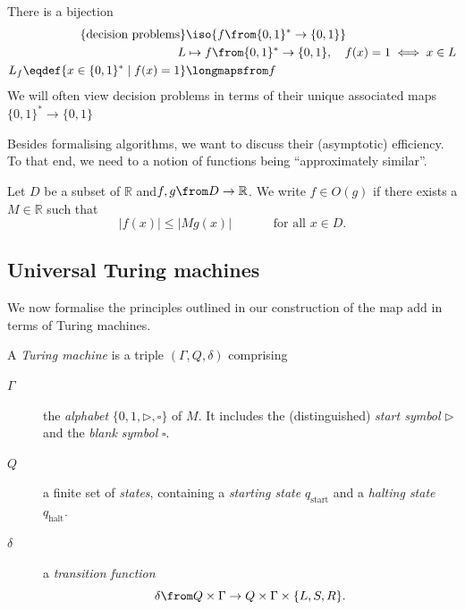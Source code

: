 \documentclass[a4paper,oneside, 12pt]{amsart}
\begin{document}
There is a bijection
\begin{equation}
  \begin{aligned}
    \{\text{decision problems}\} &\iso \{f\from\{0,1\}^{*} \to \{0,1\}\}\\
    L &\mapsto  f\from\{0,1\}^{*} \to \{0,1\}, \quad f(x)= 1 \iff x \in L \\
    L_{f}\eqdef\{x \in\{0,1\}^{*} \mid f(x) = 1\} & \longmapsfrom f
  \end{aligned}
\end{equation}
We will often view decision problems in terms of their unique associated maps \(\{0,1\}^{*}\to\{0, 1\}\)
\medskip

Besides formalising algorithms, we want to discuss their (asymptotic) efficiency.
To that end, we need to a notion of functions being ``approximately similar''.

\begin{definition}\label{def:O-notation}
  Let \(D\) be a subset of \( \mathbb{R}\) and\(f, g \from D \to \mathbb{R}\).
  We write \(f \in O(g)\) if there exists a \(M\in \mathbb{R}\) such that
  \begin{equation}
    |f(x)| \leq |M g(x) | \qquad\quad \text{ for all } x \in D.
  \end{equation}

\end{definition}


\subsection{Universal Turing machines}\label{sec:universal-turing-machines}
We now formalise the principles outlined in our construction of the map \(\mathrm{add}\) in terms of Turing machines.

\begin{definition}\label{def:Turing-machine}
  A \emph{Turing machine} is a triple \((\Gamma, Q, \delta)\) comprising
  \begin{description}
    \item[\(\Gamma\)] the \emph{alphabet} \(\{0,1,\rhd, \square \}\) of \(M\).
    It includes  the (distinguished) \emph{start symbol} \(\rhd\) and the \emph{blank symbol} \(\square\).
    \item[\(Q\)] a finite set of \emph{states}, containing a \emph{starting state} \(q_{\mathrm{start}}\) and a \emph{halting state} \(q_{\mathrm{halt}}\).
    \item[\(\delta\)] a \emph{transition function}
    \begin{equation*}
      \delta \from Q \times \Gamma \to Q \times \Gamma\times\{L,S,R\}.
    \end{equation*}
  \end{description}
\end{definition}
\end{document}
